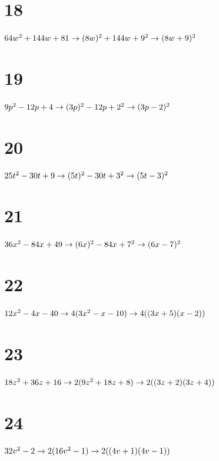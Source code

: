 \documentclass{article}
\theoremstyle{definition}
\begin{document}
\section*{18}
$64w^2+144w+81\newline\rightarrow (8w)^2+144w+9^2\newline\rightarrow (8w+9)^2$

\section*{19}
$9p^2-12p+4\newline\rightarrow (3p)^2-12p+2^2\newline\rightarrow (3p-2)^2$

\section*{20}
$25t^2-30t+9\newline\rightarrow (5t)^2-30t+3^2\newline\rightarrow (5t-3)^2$

\section*{21}
$36x^2-84x+49\newline\rightarrow (6x)^2-84x+7^2\newline\rightarrow (6x-7)^2$

\section*{22}
$12x^2-4x-40\newline\rightarrow 4(3x^2-x-10)\newline\rightarrow 4((3x+5)(x-2))$

\section*{23}
$18z^2+36z+16\newline\rightarrow 2(9z^2+18z+8)\newline\rightarrow 2((3z+2)(3z+4))$

\section*{24}
$32v^2-2\newline\rightarrow 2(16v^2-1)\newline\rightarrow 2((4v+1)(4v-1))$
\end{document}
